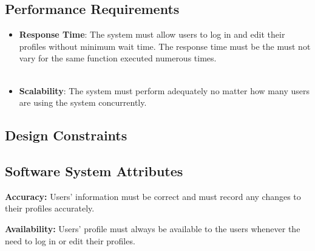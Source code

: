 \subsection{Performance Requirements}
\begin{itemize}
\item \textbf{Response Time}: The system must allow users to log in and edit their profiles without  minimum wait time. The response time must be the must not vary for the same function executed numerous times.\\	\\

\item \textbf{Scalability}: The system must perform adequately no matter how many users are using the system concurrently.
	
\end{itemize}
\subsection{Design Constraints}

\subsection{Software System Attributes}
{ 
    \begin{flushleft}
    \par\textbf{Accuracy: }Users' information must be correct and must record any changes to their profiles accurately.\newline
    
    \par\textbf{Availability: }Users' profile must always be available to the users whenever the need to log in or edit their profiles.\newline
    \end{flushleft}
}


